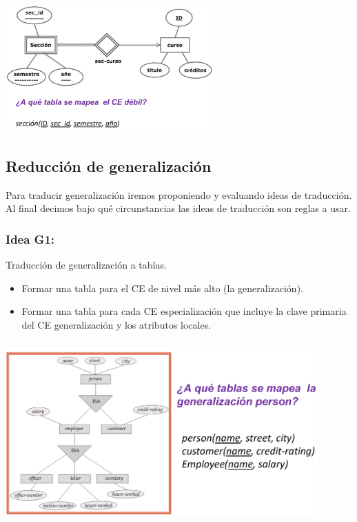 \documentclass[12pt,a4paper]{report}
\begin{document}
			\begin{center}
				\includegraphics[width=8cm, height=5cm]{./imagenes/ced.png}
			\end{center}
			
		\subsection{Reducción de generalización}
			\par Para traducir generalización iremos proponiendo y evaluando ideas de traducción. Al final decimos bajo qué circunstancias las ideas de traducción son reglas a usar.
			
			\subsubsection{Idea G1:} Traducción de generalización a tablas.
				\begin{itemize}
					\item Formar una tabla para el CE de nivel más alto (la generalización).
					\item Formar una tabla para cada CE especialización que incluye la clave primaria del CE generalización y los atributos locales.
				\end{itemize}

				\begin{center}
					\includegraphics[width=12cm, height=7cm]{./imagenes/g1.png}
				\end{center}
			
\end{document}
